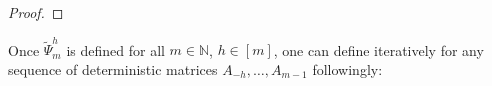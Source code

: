 \documentclass[a4papaer, titlepage]{book}
\begin{document}
\begin{proof}
\end{proof}
Once $\tilde \Psi_m^h$ is defined for all $m\in \mathbb N$, $h\in[m]$, one can define iteratively for any sequence of deterministic matrices $A_{-h},\ldots, A_{m-1}$ followingly:
\end{document}
